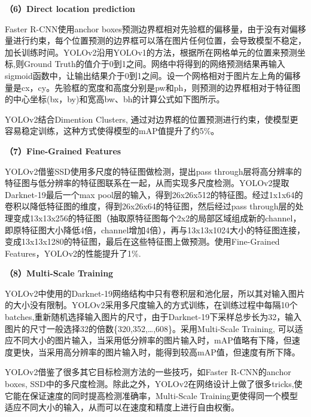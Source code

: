 \begin{figure}
\centering
\caption{}
\end{figure}

\textbf{（6）Direct location prediction}

Faster R-CNN使用anchor
boxes预测边界框相对先验框的偏移量，由于没有对偏移量进行约束，每个位置预测的边界框可以落在图片任何位置，会导致模型不稳定，加长训练时间。YOLOv2沿用YOLOv1的方法，根据所在网格单元的位置来预测坐标,则Ground
Truth的值介于0到1之间。网络中将得到的网络预测结果再输入sigmoid函数中，让输出结果介于0到1之间。设一个网格相对于图片左上角的偏移量是cx，cy。先验框的宽度和高度分别是pw和ph，则预测的边界框相对于特征图的中心坐标(bx，by)和宽高bw、bh的计算公式如下图所示。

\begin{figure}
\centering
\caption{}
\end{figure}

YOLOv2结合Dimention Clusters,
通过对边界框的位置预测进行约束，使模型更容易稳定训练，这种方式使得模型的mAP值提升了约5\%。

\textbf{（7）Fine-Grained Features}

YOLOv2借鉴SSD使用多尺度的特征图做检测，提出pass
through层将高分辨率的特征图与低分辨率的特征图联系在一起，从而实现多尺度检测。YOLOv2提取Darknet-19最后一个max
pool层的输入，得到26x26x512的特征图。经过1x1x64的卷积以降低特征图的维度，得到26x26x64的特征图，然后经过pass
through层的处理变成13x13x256的特征图（抽取原特征图每个2x2的局部区域组成新的channel，即原特征图大小降低4倍，channel增加4倍），再与13x13x1024大小的特征图连接，变成13x13x1280的特征图，最后在这些特征图上做预测。使用Fine-Grained
Features，YOLOv2的性能提升了1\%.

\textbf{（8）Multi-Scale Training}

YOLOv2中使用的Darknet-19网络结构中只有卷积层和池化层，所以其对输入图片的大小没有限制。YOLOv2采用多尺度输入的方式训练，在训练过程中每隔10个batches,重新随机选择输入图片的尺寸，由于Darknet-19下采样总步长为32，输入图片的尺寸一般选择32的倍数\{320,352,\ldots{},608\}。采用Multi-Scale
Training,
可以适应不同大小的图片输入，当采用低分辨率的图片输入时，mAP值略有下降，但速度更快，当采用高分辨率的图片输入时，能得到较高mAP值，但速度有所下降。

YOLOv2借鉴了很多其它目标检测方法的一些技巧，如Faster R-CNN的anchor
boxes,
SSD中的多尺度检测。除此之外，YOLOv2在网络设计上做了很多tricks,使它能在保证速度的同时提高检测准确率，Multi-Scale
Training更使得同一个模型适应不同大小的输入，从而可以在速度和精度上进行自由权衡。

